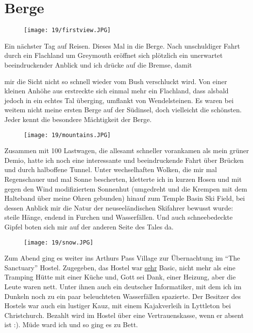 \chapter{Berge}
\begin{figure}[h]
  \centering
  \texttt{[image: 19/firstview.JPG]}
\end{figure}

Ein nächster Tag auf Reisen. Dieses Mal in die Berge. Nach unschuldiger
Fahrt durch ein Flachland um Greymouth eröffnet sich plötzlich ein
unerwartet beeindruckender Anblick und ich drücke auf die Bremse, damit

mir die Sicht nicht so schnell wieder vom Bush verschluckt wird. Von
einer kleinen Anhöhe aus erstreckte sich einmal mehr ein Flachland, dass
alsbald jedoch in ein echtes Tal überging, umflankt von Wendelsteinen.
Es waren bei weitem nicht meine ersten Berge auf der Südinsel, doch
vielleicht die schönsten. Jeder kennt die besondere Mächtigkeit der
Berge.

\begin{figure}[h]
  \centering
  \texttt{[image: 19/mountains.JPG]}
\end{figure}
Zusammen mit 100 Lastwagen, die allesamt schneller vorankamen als mein
grüner Demio, hatte ich noch eine interessante und beeindruckende Fahrt
über Brücken und durch halboffene Tunnel. Unter wechselhaften Wolken,
die mir mal Regenschauer und mal Sonne bescherten, kletterte ich in
kurzen Hosen und mit gegen den Wind modifiziertem Sonnenhut (umgedreht
und die Krempen mit dem Halteband über meine Ohren gebunden) hinauf zum
Temple Basin Ski Field, bei dessen Anblick mir die Natur der
neuseeländischen Skifahrer bewusst wurde: steile Hänge, endend in
Furchen und Wasserfällen. Und auch schneebedeckte Gipfel boten sich mir
auf der anderen Seite des Tales da.
\begin{figure}[h]
  \centering
  \texttt{[image: 19/snow.JPG]}
\end{figure}

Zum Abend ging es weiter ins Arthurs Pass Village zur Übernachtung im
``The Sanctuary'' Hostel. Zugegeben, das Hostel war \underline{sehr}
Basic, nicht mehr als eine Tramping Hütte mit einer Küche und, Gott
sei Dank, einer Heizung, aber die Leute waren nett. Unter ihnen auch
ein deutscher Informatiker, mit dem ich im Dunkeln noch zu ein paar
beleuchteten Wasserfällen spazierte. Der Besitzer des Hostels war auch
ein lustiger Kauz, mit einem Kajakverleih in Lyttleton bei
Christchurch. Bezahlt wird im Hostel über eine Vertrauenskasse, wenn
er absent ist :). Müde ward ich und so ging es zu Bett.
